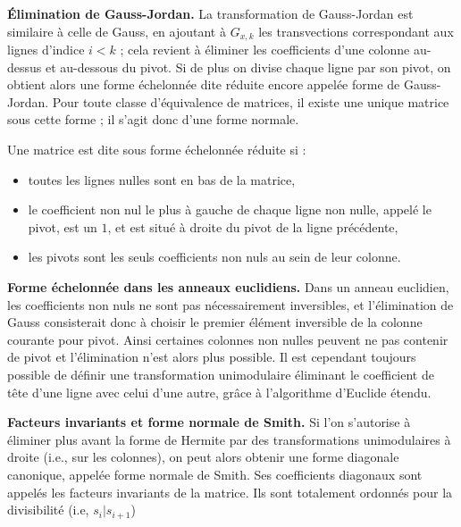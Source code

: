 \begin{flushleft}
\textbf{Élimination de Gauss-Jordan.} La transformation de Gauss-Jordan est similaire à celle de Gauss, en ajoutant à $G_{x,k}$ les transvections correspondant aux lignes d’indice $i < k$ ; cela revient à éliminer les coefficients d’une colonne au-dessus et au-dessous du pivot. Si de plus on divise chaque ligne par son pivot, on obtient alors une forme échelonnée dite réduite encore appelée forme de Gauss-Jordan. Pour toute classe d’équivalence de matrices, il existe une unique matrice sous cette forme ; il s’agit donc d’une forme normale.
\end{flushleft}

\begin{definition}
Une matrice est dite sous forme échelonnée réduite si :
 \begin{itemize}
  \item toutes les lignes nulles sont en bas de la matrice,
  \item le coefficient non nul le plus à gauche de chaque ligne non nulle, appelé le pivot, est un $1$, et est situé à droite du pivot de la ligne précédente,
  \item les pivots sont les seuls coefficients non nuls au sein de leur colonne. 
 \end{itemize}
\end{definition}

\begin{flushleft}
\textbf{Forme échelonnée dans les anneaux euclidiens.} Dans un anneau euclidien, les coefficients non nuls ne sont pas nécessairement inversibles, et l’élimination de Gauss consisterait donc à choisir le premier élément inversible de la colonne courante pour pivot. Ainsi certaines colonnes non nulles peuvent ne pas contenir
de pivot et l’élimination n’est alors plus possible. Il est cependant toujours possible de définir une transformation unimodulaire éliminant le coefficient de tête d’une ligne avec celui d’une autre, grâce à
l’algorithme d’Euclide étendu.
\end{flushleft}

\begin{flushleft}
\textbf{Facteurs invariants et forme normale de Smith.} Si l’on s’autorise à éliminer plus avant la forme de Hermite par des transformations unimodulaires à droite (i.e., sur les colonnes), on peut alors obtenir une forme diagonale canonique, appelée forme normale de Smith. Ses coefficients diagonaux sont appelés les facteurs
invariants de la matrice. Ils sont totalement ordonnés pour la divisibilité (i.e, $s_{i}\vert s_{i+1}$)
\end{flushleft}

